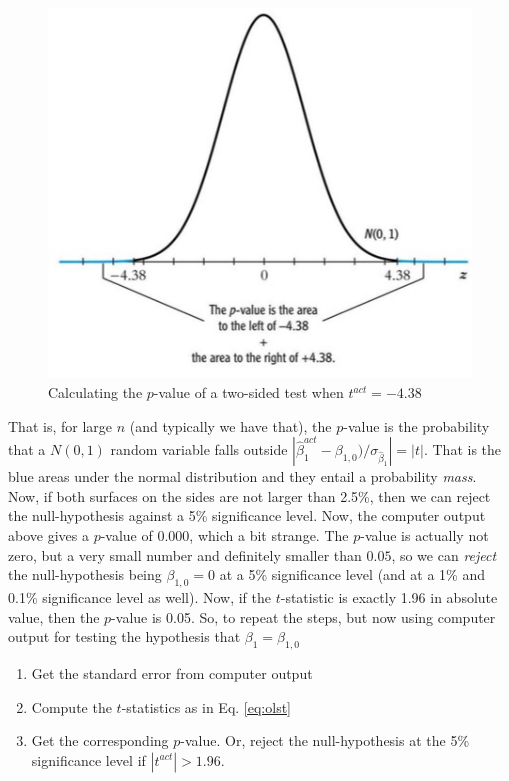 \documentclass[
]{book}
\providecommand{\tightlist}{%
  \setlength{\itemsep}{0pt}\setlength{\parskip}{0pt}}
\begin{document}
\begin{figure}

{\centering \includegraphics[width=600px]{./figures/lecture_sheet9} 

}

\caption{Calculating the $p$-value of a two-sided test when $t^{act} = -4.38$}\label{fig:pvalues}
\end{figure}

That is, for large \(n\) (and typically we have that), the \(p\)-value is the probability that a \(N(0,1)\) random variable falls outside \(|\hat{\beta}_1^{act} - \beta_{1,0})/\sigma_{\hat{\beta}_1} | = |t|\). That is the blue areas under the normal distribution and they entail a probability \emph{mass}. Now, if both surfaces on the sides are not larger than 2.5\%, then we can reject the null-hypothesis against a 5\% significance level. Now, the computer output above gives a \(p\)-value of \(0.000\), which a bit strange. The \(p\)-value is actually not zero, but a very small number and definitely smaller than \(0.05\), so we can \emph{reject} the null-hypothesis being \(\beta_{1,0} = 0\) at a 5\% significance level (and at a 1\% and 0.1\% significance level as well). Now, if the \(t\)-statistic is exactly 1.96 in absolute value, then the \(p\)-value is 0.05. So, to repeat the steps, but now using computer output for testing the hypothesis that \(\beta_1 = \beta_{1,0}\)

\begin{enumerate}
\def\labelenumi{\arabic{enumi}.}
\tightlist
\item
  Get the standard error from computer output
\item
  Compute the \(t\)-statistics as in Eq. \eqref{eq:olst}
\item
  Get the corresponding \(p\)-value. Or, reject the null-hypothesis at the 5\% significance level if \(|t^{act}| > 1.96\).
\end{enumerate}
\end{document}
